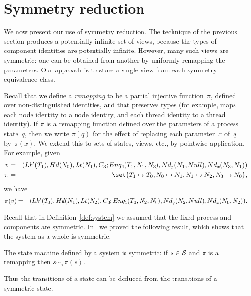\section{Symmetry reduction}
\label{sec:symmetry}

We now present our use of symmetry reduction.  The technique of the previous
section produces a potentially infinite set of views, because the types of
component identities are potentially infinite.  However, many such views are
symmetric: one can be obtained from another by uniformly remapping the
parameters.  Our approach is to store a single view from each symmetry
equivalence class.   

Recall that we define a \emph{remapping} to be a partial injective
function~$\pi$, defined over non-distinguished identities, and that preserves
types (for example, maps each node identity to a node identity, and each
thread identity to a thread identity).
%
If $\pi$ is a remapping function defined over the parameters of a process
state~$q$, then we write $\pi(q)$ for the effect of replacing each
parameter~$x$ of~$q$ by~$\pi(x)$.  We extend this to sets of states, views,
etc., by pointwise application.  For example, given
%
\begin{eqnarray*}
v & = & 
  \begin{align}
  (\Lock'(T_1), \Head(N_0), \Last(N_1), \Con_3; 
    Enq_4(T_1, N_1, N_3), \Node_y(N_1, Null),\Node_x(N_3, N_1))
  \end{align} \\
\pi & = & 
  \set{ T_1 \mapsto T_0, N_0 \mapsto N_1, N_1 \mapsto N_2, N_3 \mapsto N_0 },
\end{eqnarray*}
%
we have 
\begin{eqnarray*}
\pi(v) & = & 
  \begin{align}
  (\Lock'(T_0), \Head(N_1), \Last(N_2), \Con_3; 
   Enq_4(T_0, N_2, N_0), \Node_y(N_2, Null),\Node_x(N_0, N_2)) .
  \end{align}
\end{eqnarray*}


Recall that in Definition~\ref{def:system} we assumed that the fixed process
and components are symmetric.  In~\cite{gavin:view-abs} we proved the
following result, which shows that the system as a whole is symmetric.
%
\begin{lemma}
\label{lem:system-pi-bisimilar}
The state machine defined by a system is symmetric: if $s \in \S$ and
$\pi$ is a remapping then $s \sim_\pi \pi(s)$.
\end{lemma}
%
Thus the transitions of a state can be deduced from the transitions of a
symmetric state. 

